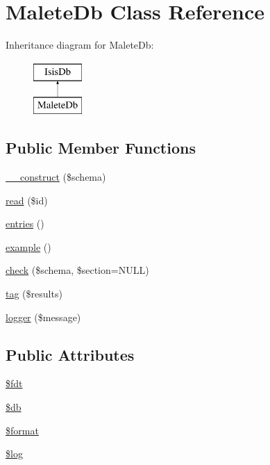 \hypertarget{classMaleteDb}{
\section{MaleteDb Class Reference}
\label{classMaleteDb}
}
Inheritance diagram for MaleteDb:\begin{figure}[H]
\begin{center}
\leavevmode
\includegraphics[height=2cm]{classMaleteDb}
\end{center}
\end{figure}
\subsection*{Public Member Functions}
\begin{DoxyCompactItemize}
\item 
\hyperlink{classMaleteDb_a60f87371bc1ec156b010e5b38b4c22e2}{\_\-\_\-construct} (\$schema)
\item 
\hyperlink{classMaleteDb_ad2a65876db24adc388afce465e0c153e}{read} (\$id)
\item 
\hyperlink{classMaleteDb_a5c6cb09a072e5d2ddce31c77098ccba4}{entries} ()
\item 
\hyperlink{classMaleteDb_a4f16c48facae498d0db1a042e9727d04}{example} ()
\item 
\hyperlink{classMaleteDb_ab2da32d84af17df79d947ae32257b4ec}{check} (\$schema, \$section=NULL)
\item 
\hyperlink{classMaleteDb_ac87c3ac1b3d9a6297be8574aa303e033}{tag} (\$results)
\item 
\hyperlink{classMaleteDb_a17562c1c53594762454d65be823fcdb5}{logger} (\$message)
\end{DoxyCompactItemize}
\subsection*{Public Attributes}
\begin{DoxyCompactItemize}
\item 
\hyperlink{classMaleteDb_af2cd60ce81381edc3ca09a6812cf79fd}{\$fdt}
\item 
\hyperlink{classMaleteDb_a4b970df3631d2763f001c96ee417f27a}{\$db}
\item 
\hyperlink{classMaleteDb_a833fed4faae9537306053ee966c06197}{\$format}
\item 
\hyperlink{classMaleteDb_ae1c8cefd1a6e661fb03c214f47336368}{\$log}
\end{DoxyCompactItemize}


